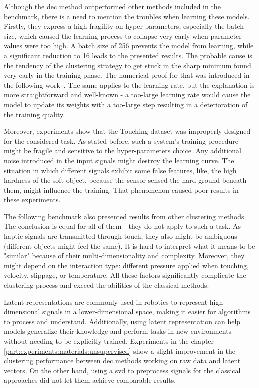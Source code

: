\documentclass[a4paper, 10pt, twoside]{report}
\begin{document}
Although the \acrshort{dec} method outperformed other methods included in the benchmark, there is a need to mention the troubles when learning these models. Firstly, they express a high fragility on hyper-parameters, especially the batch size, which caused the learning process to collapse very early when parameter values were too high. A batch size of 256 prevents the model from learning, while a significant reduction to 16 leads to the presented results. The probable cause is the tendency of the clustering strategy to get stuck in the sharp minimum found very early in the training phase. The numerical proof for that was introduced in the following work~\cite{large_batch_bad}. The same applies to the learning rate, but the explanation is more straightforward and well-known - a too-large learning rate would cause the model to update its weights with a too-large step resulting in a deterioration of the training quality.

Moreover, experiments show that the Touching dataset was improperly designed for the considered task. As stated before, such a system's training procedure might be fragile and sensitive to the hyper-parameters choice. Any additional noise introduced in the input signals might destroy the learning curve. The situation in which different signals exhibit some false features, like, \eg the high hardness of the soft object, because the sensor sensed the hard ground beneath them, might influence the training. That phenomenon caused poor results in these experiments.

The following benchmark also presented results from other clustering methods. The conclusion is equal for all of them - they do not apply to such a task. As haptic signals are transmitted through touch, they also might be ambiguous (different objects might feel the same). It is hard to interpret what it means to be "similar" because of their multi-dimensionality and complexity. Moreover, they might depend on the interaction type: different pressure applied when touching, velocity, slippage, or temperature. All these factors significantly complicate the clustering process and exceed the abilities of the classical methods. 

Latent representations are commonly used in robotics to represent high-dimensional signals in a lower-dimensional space, making it easier for algorithms to process and understand. Additionally, using latent representation can help models generalize their knowledge and perform tasks in new environments without needing to be explicitly trained. Experiments in the chapter \ref{part:experiments:materials:unsupervised} show a slight improvement in the clustering performance between \acrshort{dec} methods working on raw data and latent vectors. On the other hand, using a \acrshort{svd} to preprocess signals for the classical approaches did not let them achieve comparable results.
\end{document}
